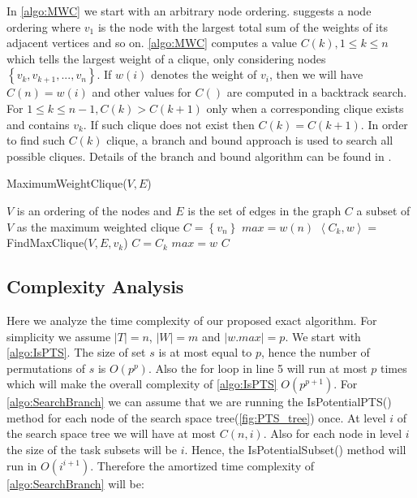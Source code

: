 In \cref{algo:MWC} we start with an arbitrary node ordering. \cite{Ostergard01} suggests a node ordering where $v_1$ is the node with the largest total sum of the weights of its adjacent vertices and so on. \cref{algo:MWC} computes a value $C(k), 1 \leq k \leq n$ which tells the largest weight of a clique, only considering nodes $\left\{v_k, v_{k+1}, ..., v_n\right\}$. If $w(i)$ denotes the weight of $v_i$, then we will have $C(n) = w(i)$ and other values for $C()$ are computed in a backtrack search. For $1 \leq k \leq n-1, C(k) > C(k+1)$ only when a corresponding clique exists and contains $v_k$. If such clique does not exist then $C(k) = C(k+1)$. In order to find such $C(k)$ clique, a branch and bound approach is used to search all possible cliques. Details of the branch and bound algorithm can be found in \cite{Ostergard01}.

\begin{algorithm}
\caption{MaximumWeightClique($V, E$)}
\label{algo:MWC}
\begin{algorithmic}[1]
\REQUIRE $V$ is an ordering of the nodes and $E$ is the set of edges in the graph
\ENSURE $C$ a subset of $V$ as the maximum weighted clique
\STATE $C = \left\{ v_n \right\}$
\STATE $max = w(n)$
	\STATE $\left\langle C_k, w \right\rangle =$ FindMaxClique($V, E, v_k$)
		\STATE $C = C_k$
		\STATE $max = w$
	\ENDIF
\ENDFOR
\RETURN $C$
\end{algorithmic}
\end{algorithm}

\subsection{Complexity Analysis}
\label{subsec:exactcomplexity}

Here we analyze the time complexity of our proposed exact algorithm. For simplicity we assume $\left\vert T \right\vert = n$, $\left\vert W \right\vert = m$ and $\left\vert w.max \right\vert = p$. We start with \cref{algo:IsPTS}. The size of set $s$ is at most equal to $p$, hence the number of permutations of $s$ is $O(p^p)$. Also the for loop in line 5 will run at most $p$ times which will make the overall complexity of \cref{algo:IsPTS} $O(p^{p+1})$. For \cref{algo:SearchBranch} we can assume that we are running the IsPotentialPTS() method for each node of the search space tree(\cref{fig:PTS_tree}) once. At level $i$ of the search space tree we will have at most $C(n,i)$. Also for each node in level $i$ the size of the task subsets will be $i$. Hence, the IsPotentialSubset() method will run in $O(i^{i+1})$. Therefore the amortized time complexity of \cref{algo:SearchBranch} will be:

